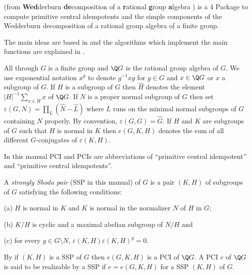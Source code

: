 
{\wedderga} (from {\bf Wed}derburn {\bf de}composition of a {\bf r}ational 
{\bf g}roup {\bf a}lgebra ) is a {\GAP}4 Package to compute primitive 
central idempotents and the simple components of the Wedderburn 
decomposition of a rational group algebra of a finite group. 

The main ideas are based in \cite{ORS} and the algorithms which implement
the main functions are explained in \cite{OR}. 

All through $G$ is a finite group and $\Q G$ is the rational group algebra of $G$. 
We use exponential notation $x^g$ to denote $g^{-1} x g$ for $g\in G$ and 
$x\in \Q G$ or $x$ a subgroup of $G$.
If $H$ is a subgroup of $G$ then $\widehat{H}$ denotes the element 
$|H|^{-1}\sum_{x\in H} x$ of $\Q G$. If $N$ is a proper normal subgroup of $G$ then set 
    $\varepsilon(G,N) = \prod_{L} (\widehat{N}-\widehat{L})$
where $L$ runs on the minimal normal subgroups of $G$ containing $N$ properly. By 
convention, $\varepsilon(G,G)=\widehat{G}$. If $H$ and $K$ are subgroups of $G$ such 
that $H$ is normal in $K$ then $e(G,K,H)$ denotes the sum of all different 
$G$-conjugates of $\varepsilon(K,H)$. 

In this manual PCI and PCIs are abbreviations of ``primitive central idempotent'' 
and ``primitive central idempotents''. 


A {\it strongly Shoda pair} (SSP in this manual) of $G$ is a pair $(K,H)$ of 
subgroups of $G$ satisfying the following conditions: 
\beginlist
\item{(a)} $H$ is normal in $K$ and $K$ is normal in the normalizer $N$ of $H$ in $G$;
\item{(b)} $K/H$ is cyclic and a maximal abelian subgroup of $N/H$ and 
\item{(c)} for every $g\in G\setminus N$,  $\varepsilon(K,H)\varepsilon(K,H)^g=0$.
\endlist

By \cite{ORS} if $(K,H)$ is a SSP of $G$ then $e(G,K,H)$ is a 
PCI of $\Q G$. A PCI $e$ of $\Q G$ is said to be realizable by a SSP if 
$e=e(G,K,H)$ for a SSP $(K,H)$ of $G$. 

